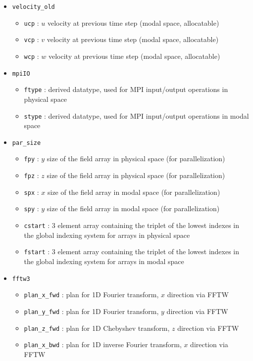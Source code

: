 \begin{itemize}
\item \texttt{velocity\_old}
\begin{itemize}
\item \texttt{ucp} : $u$ velocity at previous time step (modal space, allocatable)
\item \texttt{vcp} : $v$ velocity at previous time step (modal space, allocatable)
\item \texttt{wcp} : $w$ velocity at previous time step (modal space, allocatable)
\end{itemize}
\item \texttt{mpiIO}
\begin{itemize}
\item \texttt{ftype} : derived datatype, used for MPI input/output operations in physical space
\item \texttt{stype} : derived datatype, used for MPI input/output operations in modal space
\end{itemize}
\item \texttt{par\_size}
\begin{itemize}
\item \texttt{fpy} : $y$ size of the field array in physical space (for parallelization)
\item \texttt{fpz} : $z$ size of the field array in physical space (for parallelization)
\item \texttt{spx} : $x$ size of the field array in modal space (for parallelization)
\item \texttt{spy} : $y$ size of the field array in modal space (for parallelization)
\item \texttt{cstart} : 3 element array containing the triplet of the lowest indexes in the global indexing system for arrays in physical space
\item \texttt{fstart} : 3 element array containing the triplet of the lowest indexes in the global indexing system for arrays in modal space
\end{itemize}
\item \texttt{fftw3}
\begin{itemize}
\item \texttt{plan\_x\_fwd} : plan for 1D Fourier transform, $x$ direction via FFTW
\item \texttt{plan\_y\_fwd} : plan for 1D Fourier transform, $y$ direction via FFTW
\item \texttt{plan\_z\_fwd} : plan for 1D Chebyshev transform, $z$ direction via FFTW
\item \texttt{plan\_x\_bwd} : plan for 1D inverse Fourier transform, $x$ direction via FFTW

\end{itemize}
\end{itemize}
